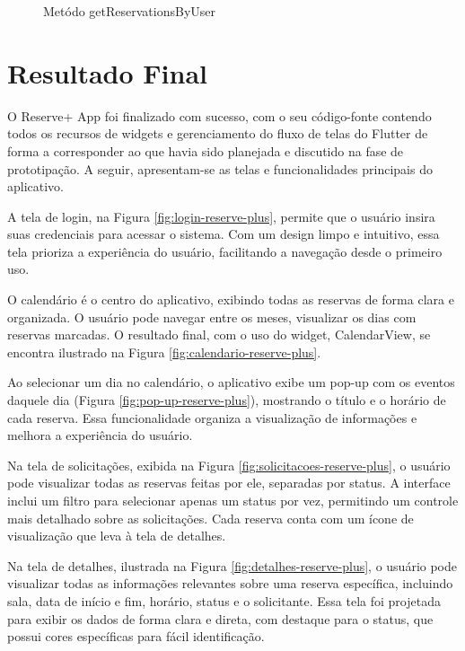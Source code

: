 \documentclass[12pt]{article}
\begin{document}
\begin{figure}[!htb]
\centering
{}
\caption{Metódo getReservationsByUser}
\label{fig:metodo}
\end{figure}

\section{Resultado Final} \label{sec:final-result}

O Reserve+ App foi finalizado com sucesso, com o seu código-fonte contendo todos os recursos de widgets e gerenciamento do fluxo de telas do Flutter de forma a corresponder ao que havia sido planejada e discutido na fase de prototipação. A seguir, apresentam-se as telas e funcionalidades principais do aplicativo.

A tela de login, na Figura \ref{fig:login-reserve-plus}, permite que o usuário insira suas credenciais para acessar o sistema. Com um design limpo e intuitivo, essa tela prioriza a experiência do usuário, facilitando a navegação desde o primeiro uso.

O calendário é o centro do aplicativo, exibindo todas as reservas de forma clara e organizada. O usuário pode navegar entre os meses, visualizar os dias com reservas marcadas. O resultado final, com o uso do widget, CalendarView, se encontra ilustrado na Figura \ref{fig:calendario-reserve-plus}.

Ao selecionar um dia no calendário, o aplicativo exibe um pop-up com os eventos daquele dia (Figura \ref{fig:pop-up-reserve-plus}), mostrando o título e o horário de cada reserva. Essa funcionalidade organiza a visualização de informações e melhora a experiência do usuário.

Na tela de solicitações, exibida na Figura \ref{fig:solicitacoes-reserve-plus}, o usuário pode visualizar todas as reservas feitas por ele, separadas por status. A interface inclui um filtro para selecionar apenas um status por vez, permitindo um controle mais detalhado sobre as solicitações. Cada reserva conta com um ícone de visualização que leva à tela de detalhes.

Na tela de detalhes, ilustrada na Figura \ref{fig:detalhes-reserve-plus}, o usuário pode visualizar todas as informações relevantes sobre uma reserva específica, incluindo sala, data de início e fim, horário, status e o solicitante. Essa tela foi projetada para exibir os dados de forma clara e direta, com destaque para o status, que possui cores específicas para fácil identificação.
\end{document}
